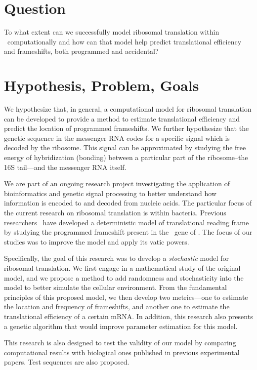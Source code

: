 \documentclass[twocolumn, article, oneside]{memoir}
\author{\BWFauthors}
\title{\BWFtitle{\emph}}
\begin{document}
\section{Question}
To what extent can we successfully model ribosomal translation within
\ecoli\ computationally and how can that model help predict
translational efficiency and frameshifts, both programmed and
accidental?

\section{Hypothesis, Problem, Goals}
We hypothesize that, in general, a computational model for ribosomal
translation can be developed to provide a method to estimate translational
efficiency and predict the location of programmed frameshifts.  We further
hypothesize that the genetic sequence in the messenger RNA codes for a 
specific signal which is decoded by the ribosome.  This signal can be 
approximated by studying the free energy of hybridization (bonding) between
a particular part of the ribosome--the 16S tail---and the messenger RNA itself.

We are part of an ongoing research project
investigating the application of bioinformatics
and genetic signal processing to better understand how
information is encoded to and decoded from nucleic acids.  The particular
focus of the current research on ribosomal translation is within
bacteria.  Previous researchers~\cite{lalit:mechanics}
have developed a deterministic model
of translational reading frame by studying the
programmed frameshift present in the \prfB\ gene of \ecoli.  The focus
of our studies was to improve the model and apply its vatic powers.

Specifically, the goal of this research was to develop a 
\emph{stochastic} model for ribosomal translation.  We first engage in
a mathematical study of the original model, and we propose a method
to add randomness and stochasticity into the model to better simulate
the cellular environment.  From the fundamental principles of this
proposed model, we then develop two metrics---one to estimate the
location and frequency of frameshifts, and another one to estimate the
translational efficiency of a certain mRNA.  In addition, this research
also presents a genetic algorithm that would improve parameter estimation
for this model.

This research is also designed to test the validity of our model
by comparing computational results with biological ones published in previous
experimental papers.  Test sequences are also proposed.
\end{document}
